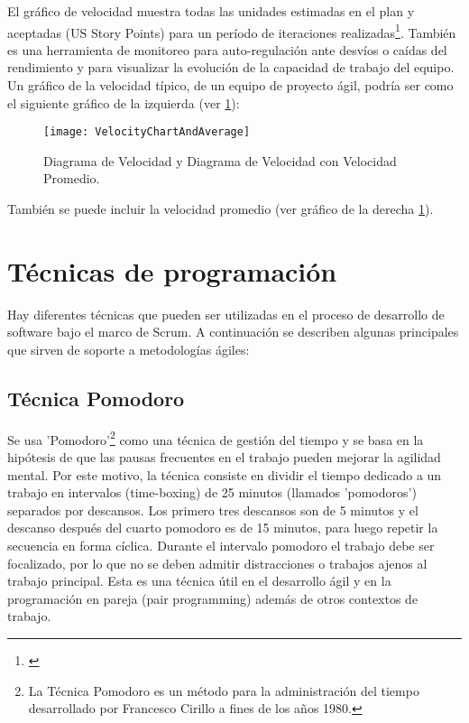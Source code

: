 El gráfico de velocidad muestra todas las unidades estimadas en el plan y aceptadas (US Story Points) para un período de iteraciones realizadas\footnote{\cite{Scrum-Alliance-2014}}. También es una herramienta de monitoreo para auto-regulación ante desvíos o caídas del rendimiento y para visualizar la evolución de la capacidad de trabajo del equipo. Un gráfico de la velocidad típico, de un equipo de proyecto ágil, podría ser como el siguiente gráfico de la izquierda (ver \ref{fig:VelocityChartAndAverage}):

\begin{figure}[h]
  \centering
  \texttt{[image: VelocityChartAndAverage]}
  \caption{Diagrama de Velocidad y Diagrama de Velocidad con Velocidad Promedio.}
  \centering
  \label{fig:VelocityChartAndAverage} %
\end{figure}
\FloatBarrier %

También se puede incluir la velocidad promedio (ver gráfico de la derecha \ref{fig:VelocityChartAndAverage}).


\newpage
\section{Técnicas de programación}

Hay diferentes técnicas que pueden ser utilizadas en el proceso de desarrollo de software bajo el marco de Scrum. A continuación se describen algunas principales que sirven de soporte a metodologías ágiles:

\subsection{Técnica Pomodoro}

Se usa 'Pomodoro'\footnote{La Técnica Pomodoro es un método para la administración del tiempo desarrollado por Francesco Cirillo a fines de los años 1980\cite{Cirillo-Francesco-1980}.} como una técnica de gestión del tiempo y se basa en la hipótesis de que las pausas frecuentes en el trabajo pueden mejorar la agilidad mental. Por este motivo, la técnica consiste en dividir el tiempo dedicado a un trabajo en intervalos (time-boxing) de 25 minutos (llamados 'pomodoros') separados por descansos. Los primero tres descansos son de 5 minutos y el descanso después del cuarto pomodoro es de 15 minutos, para luego repetir la secuencia en forma cíclica. Durante el intervalo pomodoro el trabajo debe ser focalizado, por lo que no se deben admitir distracciones o trabajos ajenos al trabajo principal. 
Esta es una técnica útil en el desarrollo ágil y en la programación en pareja (pair programming) además de otros contextos de trabajo.


